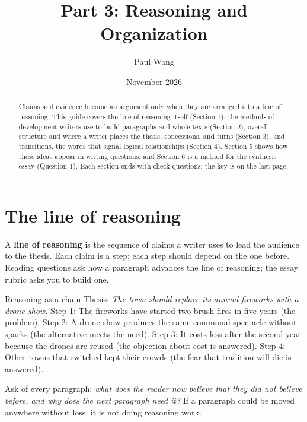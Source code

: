\documentclass[11pt]{article}
\title{Part 3: Reasoning and Organization}
\author{Paul Wang}
\date{November 2026}
\begin{document}
\maketitle

\begin{abstract}
Claims and evidence become an argument only when they are arranged into a line of reasoning. This guide covers the line of reasoning itself (Section 1), the methods of development writers use to build paragraphs and whole texts (Section 2), overall structure and where a writer places the thesis, concessions, and turns (Section 3), and transitions, the words that signal logical relationships (Section 4). Section 5 shows how these ideas appear in writing questions, and Section 6 is a method for the synthesis essay (Question 1). Each section ends with check questions; the key is on the last page.
\end{abstract}


\section{The line of reasoning}

A \textbf{line of reasoning} is the sequence of claims a writer uses to lead the audience to the thesis. Each claim is a step; each step should depend on the one before. Reading questions ask how a paragraph advances the line of reasoning; the essay rubric asks you to build one.

\begin{study}{Reasoning as a chain}
Thesis: \emph{The town should replace its annual fireworks with a drone show.}
Step 1: The fireworks have started two brush fires in five years (the problem). Step 2: A drone show produces the same communal spectacle without sparks (the alternative meets the need). Step 3: It costs less after the second year because the drones are reused (the objection about cost is answered). Step 4: Other towns that switched kept their crowds (the fear that tradition will die is answered).
\end{study}

\begin{keyidea}
Ask of every paragraph: \emph{what does the reader now believe that they did not believe before, and why does the next paragraph need it?} If a paragraph could be moved anywhere without loss, it is not doing reasoning work.
\end{keyidea}
\end{document}
